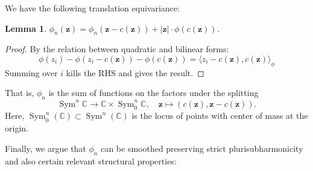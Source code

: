\documentclass{article}
\def\C{\mathbb{C}}
\DeclareMathOperator{\Sym}{Sym}
\newtheorem{lemma}[theorem]{Lemma}
\theoremstyle{definition}
\begin{document}
We have the following translation equivariance: 

\begin{lemma} \label{translation equivariance}
        $\phi_{n}(\mathbf{z}) = \phi_{n}(\mathbf{z} - c(\mathbf{z})) + |\mathbf{z}| \cdot  \phi(c(\mathbf{z}))$.
\end{lemma}
\begin{proof}
    By the relation between quadratic and bilinear forms:
    $$\phi(z_i) - \phi(z_i - c(\mathbf{z})) - \phi(c(\mathbf{z})) = \langle z_i - c(\mathbf{z}), c(\mathbf{z}) \rangle_{\phi} $$
    Summing over $i$ kills the RHS and gives the result. 
\end{proof}

That is, $\phi_n$ is the sum of functions on the factors under the splitting
$$ \Sym^n \C \to \C \times \Sym^n_0 \C, \quad \mathbf{z} \mapsto (c(\mathbf{z}), \mathbf{z} - c(\mathbf{z})). $$
Here,  $\Sym^n_0(\C) \subset \Sym^n(\C)$ is the locus of points with center of mass at the origin.  



Finally, we argue that $\phi_n$ can be smoothed preserving strict plurisubharmonicity and also certain relevant structural properties: 
\end{document}
